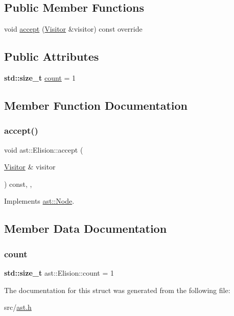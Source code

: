 \subsection*{Public Member Functions}
\begin{DoxyCompactItemize}
\item 
void \hyperlink{structast_1_1_elision_a6a3fc3746613bdc5228629bf296b50e3}{accept} (\hyperlink{structast_1_1_visitor}{Visitor} \&visitor) const override
\end{DoxyCompactItemize}
\subsection*{Public Attributes}
\begin{DoxyCompactItemize}
\item 
\textbf{ std\+::size\+\_\+t} \hyperlink{structast_1_1_elision_afa81a1129d9ce7f1f59d08a74961ca62}{count} = 1
\end{DoxyCompactItemize}


\subsection{Member Function Documentation}
\mbox{\label{structast_1_1_elision_a6a3fc3746613bdc5228629bf296b50e3}} 
\subsubsection{\texorpdfstring{accept()}{accept()}}
{\footnotesize\ttfamily void ast\+::\+Elision\+::accept (\begin{DoxyParamCaption}\item[{\hyperlink{structast_1_1_visitor}{Visitor} \&}]{visitor }\end{DoxyParamCaption}) const\hspace{0.3cm}{\ttfamily [inline]}, {\ttfamily [override]}, {\ttfamily [virtual]}}



Implements \hyperlink{structast_1_1_node_abc089ee6caaf06a4445ebdd8391fdebc}{ast\+::\+Node}.



\subsection{Member Data Documentation}
\mbox{\label{structast_1_1_elision_afa81a1129d9ce7f1f59d08a74961ca62}} 
\subsubsection{\texorpdfstring{count}{count}}
{\footnotesize\ttfamily \textbf{ std\+::size\+\_\+t} ast\+::\+Elision\+::count = 1}



The documentation for this struct was generated from the following file\+:\begin{DoxyCompactItemize}
\item 
src/\hyperlink{ast_8h}{ast.\+h}\end{DoxyCompactItemize}
